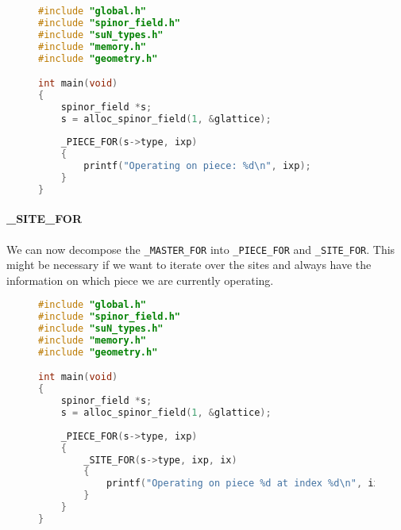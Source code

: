 \documentclass[12pt]{article}
\begin{document}
\begin{figure}[H]
\begin{lstlisting}[caption=\_PIECE\_FOR lets us identify the piece we are operating on,language=C]
#include "global.h"
#include "spinor_field.h"
#include "suN_types.h"
#include "memory.h"
#include "geometry.h"

int main(void) 
{
    spinor_field *s;
    s = alloc_spinor_field(1, &glattice);
    
    _PIECE_FOR(s->type, ixp) 
    {
        printf("Operating on piece: %d\n", ixp);
    }
}
\end{lstlisting}
\end{figure}

\paragraph{\_SITE\_FOR} We can now decompose the \texttt{\_MASTER\_FOR} into \texttt{\_PIECE\_FOR} and \texttt{\_SITE\_FOR}. This might be necessary if we want to iterate over the sites and always have the information on which piece we are currently operating.

\begin{figure}[H]
\begin{lstlisting}[caption=Using \_PIECE\_FOR and \_SITE\_FOR to iterate over all sites,language=C]
#include "global.h"
#include "spinor_field.h"
#include "suN_types.h"
#include "memory.h"
#include "geometry.h"

int main(void) 
{
    spinor_field *s;
    s = alloc_spinor_field(1, &glattice);
    
    _PIECE_FOR(s->type, ixp) 
    {
        _SITE_FOR(s->type, ixp, ix) 
        {
            printf("Operating on piece %d at index %d\n", ixp, ix);
        }
    }
}
\end{lstlisting}
\end{figure}
\end{document}
